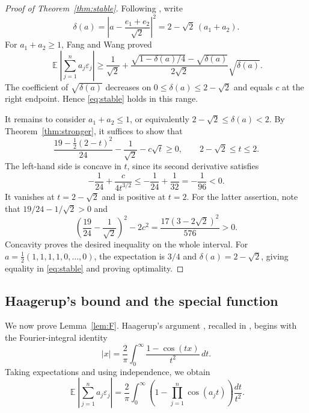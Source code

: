 \documentclass[a4paper,twoside,11pt,reqno]{amsart}
\theoremstyle{definition}
\theoremstyle{remark}
\newcommand{\1}{\mathbbm{1}}
\DeclareMathOperator{\E}{\mathbb{E}}
\begin{document}
\begin{proof}[Proof of Theorem~\ref{thm:stable}]
Following \cite{ENT24}, write
\begin{equation}\label{eq:delta}
 \delta(a)=\left|a-\frac{e_1+e_2}{\sqrt2}\right|^2
          =2-\sqrt2\,(a_1+a_2).
\end{equation}
For $a_1+a_2\ge1$, Fang and Wang \cite[Theorem~1]{FW26} proved
\[
 \E\left|\sum_{j=1}^n a_j\varepsilon_j\right|
 \ge\frac1{\sqrt2}
 +\frac{\sqrt{1-\delta(a)/4}-\sqrt{\delta(a)}}{2\sqrt2}
       \sqrt{\delta(a)}.
\]
The coefficient of $\sqrt{\delta(a)}$ decreases on $0\le\delta(a)\le2-\sqrt2$ and equals $c$ at the right endpoint. Hence \eqref{eq:stable} holds in this range.

It remains to consider $a_1+a_2\le1$, or equivalently $2-\sqrt2\le\delta(a)<2$. By Theorem~\ref{thm:stronger}, it suffices to show that
\[
 \frac{19-\tfrac12(2-t)^2}{24}-\frac1{\sqrt2}-c\sqrt t\ge0,
 \qquad 2-\sqrt2\le t\le2.
\]
The left-hand side is concave in $t$, since its second derivative satisfies
\[
 -\frac1{24}+\frac{c}{4t^{3/2}}
 \le-\frac1{24}+\frac1{32}=-\frac1{96}<0.
\]
It vanishes at $t=2-\sqrt2$ and is positive at $t=2$. For the latter assertion, note that $19/24-1/\sqrt2>0$ and
\[
 \left(\frac{19}{24}-\frac1{\sqrt2}\right)^2-2c^2
 =\frac{17(3-2\sqrt2)^2}{576}>0.
\]
Concavity proves the desired inequality on the whole interval. For $a=\frac12(1,1,1,1,0,\ldots,0)$, the expectation is $3/4$ and $\delta(a)=2-\sqrt2$, giving equality in \eqref{eq:stable} and proving optimality.
\end{proof}

\subsection{Haagerup's bound and the special function}\label{subsec:F}
We now prove Lemma~\ref{lem:F}. Haagerup's argument \cite{Haa81}, recalled in \cite[Section~4.2, proof of Theorem~32]{NT23}, begins with the Fourier-integral identity
\[
 |x|=\frac2\pi\int_0^\infty\frac{1-\cos(tx)}{t^2}\,dt.
\]
Taking expectations and using independence, we obtain
\begin{equation}\label{eq:fourier}
 \E\left|\sum_{j=1}^n a_j\varepsilon_j\right|
 =\frac2\pi\int_0^\infty\left(1-\prod_{j=1}^n\cos(a_jt)\right)\frac{dt}{t^2}.
\end{equation}
\end{document}
